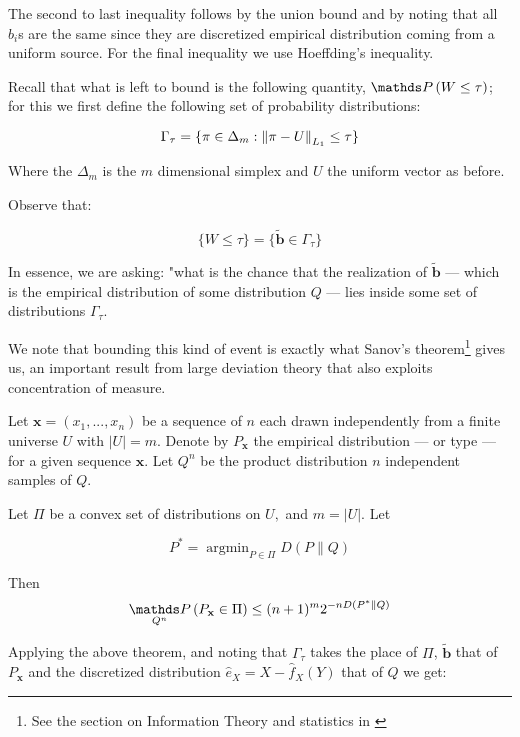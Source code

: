 The second to last inequality follows by the union bound and by noting that all $b_i$s are the same since they
are discretized empirical distribution coming from a uniform source. For the final inequality we use Hoeffding's
inequality.


Recall that what is left to bound is the following quantity, $\Prob\left(W \leq \tau \right)$; 
for this we first define the following set of probability distributions:

$$
    \Gamma_\tau = \{ \pi \in  \Delta_m : \left\lVert\pi - U\right\rVert_{L_1} \leq \tau \}
$$

Where the $\Delta_m$ is the $m$ dimensional simplex and $U$ the uniform vector as before.

Observe that: 

$$
    \{ W \leq \tau \} = \{ \tilde{\mathbf{b}} \in \Gamma_\tau \}
$$

In essence, we are asking: "what is the chance that the realization of $\tilde{\mathbf{b}}$ --- which is the 
empirical distribution of some distribution $Q$ --- lies inside some set of distributions $\Gamma_\tau$.

We note that bounding this kind of event is exactly what Sanov's theorem\footnote{See the section on Information Theory and statistics in 
\cite{cover1999elements}} gives us, an important
result from large deviation theory that also exploits concentration of measure.



Let $\mathbf{x} = (x_1, ..., x_n)$ be a sequence of $n$ each drawn independently from 
a finite universe $U$ with $|U| = m$. Denote by $P_\mathbf{x}$ the empirical distribution --- 
or type --- for a given sequence $\mathbf{x}$. Let $Q^{n}$ be the product distribution $n$
independent samples of $Q$. 

\begin{theorem}\label{sanov}

    Let $\Pi$ be a convex set of distributions on $U,$ and $m=|U| .$ Let

    \[
        P^{*}=\operatorname{argmin}_{P \in \Pi} D(P \| Q)
    \]
    
    Then
    \[
        \underset{Q^{n}}{\Prob}\left(P_{\mathbf{x}} \in \Pi\right) \leq(n+1)^{m} 2^{-nD\left(P^{*} \| Q\right)}
    \]
    
\end{theorem}

Applying the above theorem, and noting that $\Gamma_\tau$ takes the place of $\Pi$, $\tilde{\mathbf{b}}$ that of $P_{\mathbf{x}}$
and the discretized distribution $\hat{e}_X = X - \hat{f}_X(Y)$ that of $Q$ we get:

